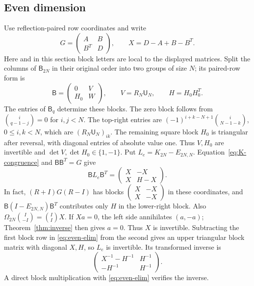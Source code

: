 \documentclass[11pt,a4paper]{amsart}
\theoremstyle{remark}\newtheorem{remark}[theorem]{Remark}
\numberwithin{equation}{section}
\newcommand{\U}{\mathsf U}
\newcommand{\B}{\mathsf B}
\begin{document}
\subsection{Even dimension}
Use reflection-paired row coordinates and write
\[
 G=\begin{pmatrix}A&B\\B^T&D\end{pmatrix},\qquad X=D-A+B-B^T.
\]
Here and in this section block letters are local to the displayed matrices. Split the columns of $\B_{2N}$ in their original order into two groups of size $N$; its paired-row form is
\[
 \B=\begin{pmatrix}0&V\\H_0&W\end{pmatrix},\qquad
 V=R_N\U_N,\qquad H=H_0H_0^T.
\]
The entries of $\B_q$ determine these blocks. The zero block follows from $\binom i{q-1-j}=0$ for $i,j<N$. The top-right entries are $(-1)^{i+k-N+1}\binom i{N-1-k}$, $0\le i,k<N$, which are $(R_N\U_N)_{ik}$. The remaining square block $H_0$ is triangular after reversal, with diagonal entries of absolute value one. Thus $V,H_0$ are invertible and $\det V,\det H_0\in\{1,-1\}$.
Put $L_e=K_{2N}-E_{2N,N}$. Equation~\eqref{eq:K-congruence} and $\B\B^T=G$ give
\begin{equation}\label{eq:even-elim}
 \B L_e\B^T=\begin{pmatrix}X&-X\\X&H-X\end{pmatrix}.
\end{equation}
In fact, $(R+I)G(R-I)$ has blocks
$\begin{pmatrix}X&-X\\X&-X\end{pmatrix}$ in these coordinates, and $\B(I-E_{2N,N})\B^T$ contributes only $H$ in the lower-right block.
Also
$\Omega_{2N}\binom I{-I}=\binom II X$.
If $Xa=0$, the left side annihilates $(a,-a)$; Theorem~\ref{thm:inverse} then gives $a=0$. Thus $X$ is invertible. Subtracting the first block row in \eqref{eq:even-elim} from the second gives an upper triangular block matrix with diagonal $X,H$, so $L_e$ is invertible. Its transformed inverse is
\begin{equation}\label{eq:even-block-inverse}
 \begin{pmatrix}X^{-1}-H^{-1}&H^{-1}\\-H^{-1}&H^{-1}\end{pmatrix}.
\end{equation}
A direct block multiplication with \eqref{eq:even-elim} verifies the inverse.
\end{document}
